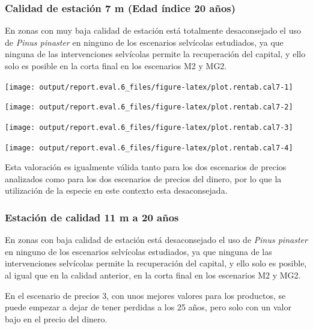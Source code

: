 \documentclass[]{article}
\begin{document}
\subsubsection{Calidad de estación 7 m (Edad índice 20
años)}\label{calidad-de-estaciuxf3n-7-m-edad-uxedndice-20-auxf1os}

En zonas con muy baja calidad de estación está totalmente desaconsejado
el uso de \emph{Pinus pinaster} en ninguno de los escenarios selvícolas
estudiados, ya que ninguna de las intervenciones selvícolas permite la
recuperación del capital, y ello solo es posible en la corta final en
los escenarios M2 y MG2.

\begin{center}\texttt{[image: output/report.eval.6\_files/figure-latex/plot.rentab.cal7-1]} \end{center}

\begin{center}\texttt{[image: output/report.eval.6\_files/figure-latex/plot.rentab.cal7-2]} \end{center}

\begin{center}\texttt{[image: output/report.eval.6\_files/figure-latex/plot.rentab.cal7-3]} \end{center}

\begin{center}\texttt{[image: output/report.eval.6\_files/figure-latex/plot.rentab.cal7-4]} \end{center}

Esta valoración es igualmente válida tanto para los dos escenarios de
precios analizados como para los dos escenarios de precios del dinero,
por lo que la utilización de la especie en este contexto esta
desaconsejada.

\subsubsection{Estación de calidad 11 m a 20
años}\label{estaciuxf3n-de-calidad-11-m-a-20-auxf1os}

En zonas con baja calidad de estación está desaconsejado el uso de
\emph{Pinus pinaster} en ninguno de los escenarios selvícolas
estudiados, ya que ninguna de las intervenciones selvícolas permite la
recuperación del capital, y ello solo es posible, al igual que en la
calidad anterior, en la corta final en los escenarios M2 y MG2.

En el escenario de precios 3, con unos mejores valores para los
productos, se puede empezar a dejar de tener perdidas a los 25 años,
pero solo con un valor bajo en el precio del dinero.
\end{document}
